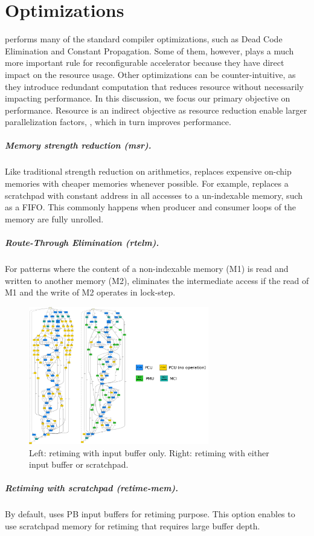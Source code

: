 \section{Optimizations}\label{sec:opt}
\name performs many of the standard compiler optimizations,
such as Dead Code Elimination and Constant Propagation.
Some of them, however, plays a much more important rule for reconfigurable accelerator because they
have direct impact on the resource usage.
Other optimizations can be counter-intuitive, as they introduce redundant computation that
reduces resource without necessarily impacting performance.
In this discussion, we focus our primary objective on performance.
Resource is an indirect objective as resource reduction enable larger parallelization factors,
, which in turn improves performance.

\subparagraph{Memory strength reduction (msr).} Like traditional strength reduction on arithmetics, \name{} replaces expensive on-chip memories with cheaper memories whenever possible.
For example, \name{} replaces a scratchpad with constant address in all accesses to a un-indexable memory, such as a FIFO.
This commonly happens when producer and consumer loops of the memory are fully unrolled.

\subparagraph{Route-Through Elimination (rtelm).} For patterns where the content of a non-indexable memory  (M1) is read and written to another memory (M2), \name{} eliminates the intermediate access if the read of M1 and the write of M2 operates in lock-step.

\begin{figure}
\centering
\includegraphics[width=0.7\textwidth]{figs/retiming.pdf}
\caption[Retiming]{
  Left: retiming with input buffer only. Right: retiming with either input buffer or scratchpad.
}
\label{fig:mlp}
\end{figure}
\subparagraph{Retiming with scratchpad (retime-mem).} By default, \name{} uses PB input buffers for retiming purpose. 
This option enables \name{} to use scratchpad memory for retiming that requires large buffer depth.

